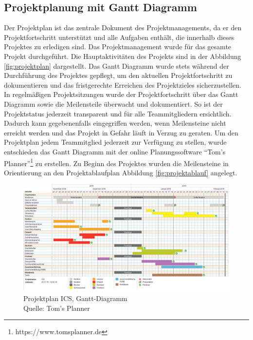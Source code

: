 	\subsection{Projektplanung mit Gantt Diagramm}
	Der Projektplan ist das zentrale Dokument des Projektmanagements, da er den Projektfortschritt unterstützt und alle Aufgaben enthält, die innerhalb dieses Projektes zu erledigen sind. Das Projektmanagement wurde für das gesamte Projekt durchgeführt. Die Hauptaktivitäten des Projekts sind in der Abbildung \vref{fig:projektplan} dargestellt. Das Gantt Diagramm wurde stets während der Durchführung des Projektes gepflegt, um den aktuellen Projektfortschritt zu dokumentieren und das fristgerechte Erreichen des Projektzieles sicherzustellen. In regelmäßigen Projektsitzungen wurde der Projektfortschritt über das Gantt Diagramm sowie die Meilensteile überwacht und dokumentiert. So ist der Projektstatus jederzeit transparent und für alle Teammitgliedern ersichtlich. Dadurch kann gegebenenfalls eingegriffen werden, wenn Meilensteine nicht erreicht werden und das Projekt in Gefahr läuft in Verzug zu geraten.  
	Um den Projektplan jedem Teammitglied jederzeit zur Verfügung zu stellen, wurde entschieden das Gantt Diagramm mit der online Planungssoftware \enquote{Tom's Planner}\footnote{https://www.tomsplanner.de} zu erstellen. Zu Beginn des Projektes wurden die Meilensteine in Orientierung an den Projektablaufplan Abbildung \vref{fig:projektablauf} angelegt. 
	\begin{figure}[H]
		\centering 
		\includegraphics[scale=0.4]{img/projektplan.png}
		\captionsetup{format=hang}
		\caption[Projektplan]{\label{fig:projektplan} Projektplan ICS, Gantt-Diagramm \\ Quelle: Tom's Planner}
	\end{figure}
